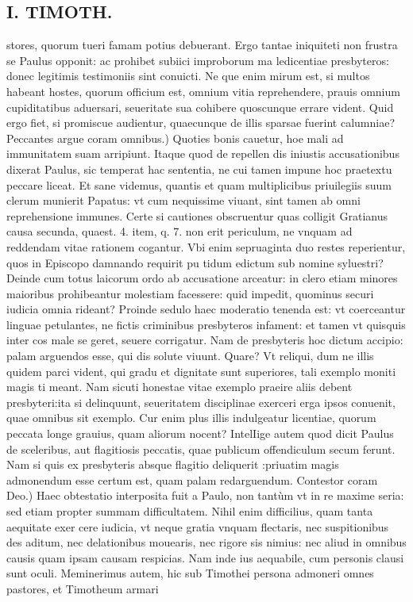 \documentclass{article}
\begin{document}
\begin{pages}
\section*{I. TIMOTH. }
\marginpar{[ p.68 ]}\pstart stores, quorum tueri famam potius debuerant. Ergo tantae iniquiteti non frustra se Paulus opponit: ac prohibet subiici improborum ma ledicentiae presbyteros: donec legitimis testimoniis sint conuicti. Ne que enim mirum est, si multos habeant hostes, quorum officium est, omnium vitia reprehendere, prauis omnium cupiditatibus aduersari, seueritate sua cohibere quoscunque errare vident. Quid ergo fiet, si promiscue audientur, quaecunque de illis sparsae fuerint calumniae?  \pend\pstart Peccantes argue coram omnibus.) Quoties bonis cauetur, hoe mali ad immunitatem suam arripiunt. Itaque quod de repellen dis iniustis accusationibus dixerat Paulus, sic temperat hac sententia, ne cui tamen impune hoc praetextu peccare liceat. Et sane videmus, quantis et quam multiplicibus priuilegiis suum clerum munierit Papatus: vt cum nequissime viuant, sint tamen ab omni reprehensione immunes. Certe si cautiones obscruentur quas colligit Gratianus causa secunda, quaest. 4. item, q. 7. non erit periculum, ne vnquam ad reddendam vitae rationem cogantur. Vbi enim sepruaginta duo restes reperientur, quos in Episcopo damnando requirit pu tidum edictum sub nomine syluestri? Deinde cum totus laicorum ordo ab accusatione arceatur: in clero etiam minores maioribus prohibeantur molestiam facessere: quid impedit, quominus securi iudicia omnia rideant? Proinde sedulo haec moderatio tenenda est: vt coerceantur linguae petulantes, ne fictis criminibus presbyteros infament: et tamen vt quisquis inter cos male se geret, seuere corrigatur. Nam de presbyteris hoc dictum accipio: palam arguendos esse, qui dis solute viuunt. Quare? Vt reliqui, dum ne illis quidem parci vident, qui gradu et dignitate sunt superiores, tali exemplo moniti magis ti meant. Nam sicuti honestae vitae exemplo praeire aliis debent presbyteri:ita si delinquunt, seueritatem disciplinae exerceri erga ipsos conuenit, quae omnibus sit exemplo. Cur enim plus illis indulgeatur licentiae, quorum peccata longe grauius, quam aliorum nocent? IntelIige autem quod dicit Paulus de sceleribus, aut flagitiosis peccatis, quae publicum offendiculum secum ferunt. Nam si quis ex presbyteris absque flagitio deliquerit :priuatim magis admonendum esse certum est, quam palam redarguendum.  \pend\pstart Contestor coram Deo.) Haec obtestatio interposita fuit a Paulo, non tantùm vt in re maxime seria: sed etiam propter summam difficultatem. Nihil enim difficilius, quam tanta aequitate exer cere iudicia, vt neque gratia vnquam flectaris, nec suspitionibus des aditum, nec delationibus mouearis, nec rigore sis nimius: nec aliud in omnibus causis quam ipsam causam respicias. Nam inde ius aequabile, cum personis clausi sunt oculi. Meminerimus autem, hic sub Timothei persona admoneri omnes pastores, et Timotheum armari  \pend

\end{pages}
\end{document}
